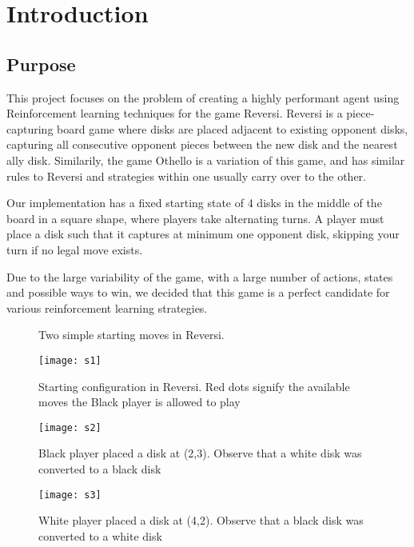 \documentclass[../report.tex]{subfiles}
\begin{document}
\section{Introduction}
\label{introduction}

\subsection{Purpose}

This project focuses on the problem of creating a highly performant agent using Reinforcement learning techniques for the game Reversi. Reversi is a piece-capturing board game where disks are placed adjacent to existing opponent disks, capturing all consecutive opponent pieces between the new disk and the nearest ally disk. Similarily, the game Othello is a variation of this game, and has similar rules to Reversi and strategies within one usually carry over to the other.

Our implementation has a fixed starting state of 4 disks in the middle of the board in a square shape, where players take alternating turns. A player must place a disk such that it captures at minimum one opponent disk, skipping your turn if no legal move exists.

Due to the large variability of the game, with a large number of actions, states and possible ways to win, we decided that this game is a perfect candidate for various reinforcement learning strategies.
\begin{figure}[h]
    \caption{Two simple starting moves in Reversi.}
    \vspace{0.5cm}
    \centering
    \begin{minipage}[t]{.30\textwidth}
        \centering
        \texttt{[image: s1]}
        \caption{Starting configuration in Reversi. Red dots signify the available moves the Black player is allowed to play}
    \end{minipage}
    \hspace{0.5cm}
    \begin{minipage}[t]{.30\textwidth}
        \centering
        \texttt{[image: s2]}
        \caption{Black player placed a disk at (2,3). Observe that a white disk was converted to a black disk}
    \end{minipage}
    \hspace{0.5cm}
    \begin{minipage}[t]{.30\textwidth}
        \centering
        \texttt{[image: s3]}
        \caption{White player placed a disk at (4,2). Observe that a black disk was converted to a white disk}
    \end{minipage}
\end{figure}
\end{document}
